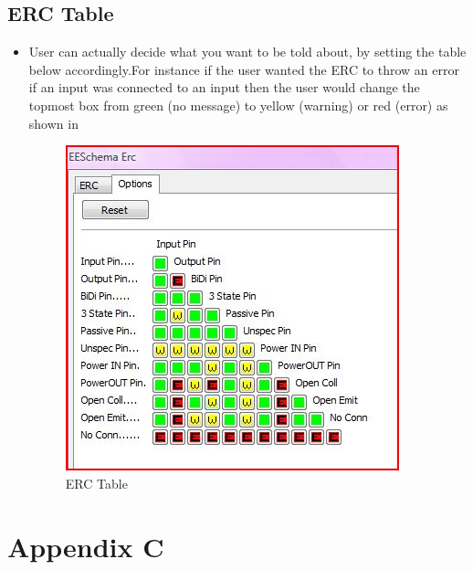 \subsection{ ERC Table}

     \begin{itemize}   

\item User can actually decide what you want to be told about, by setting the table below accordingly.For instance if the user wanted the ERC to throw an error if an input was connected to an input then the user would change the topmost box from green (no message) to yellow (warning) or red (error) as shown in  

        \begin{figure}[!htp]
            \centering
            \includegraphics[width =\lgfig]{erctable.jpg}
            \caption{ERC Table}
         \end{figure}
\end {itemize}

  \section{Appendix C}
